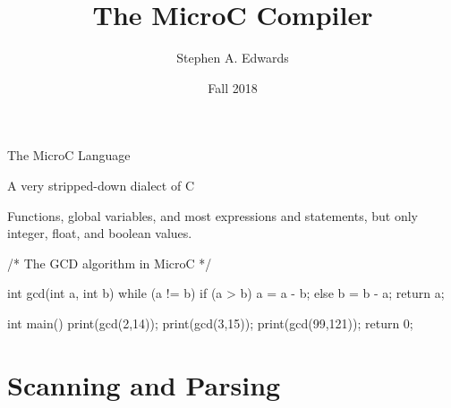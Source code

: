 \documentclass{plt}
\title{The MicroC Compiler}
\author{Stephen A. Edwards}
\institute{Columbia University}
\date{Fall 2018}
\begin{document}
\frame{\titlepage}

\frame{\tableofcontents}

\begin{frame}[fragile=singleslide]{The MicroC Language}

A very stripped-down dialect of C

Functions, global variables, and most expressions and statements, but
only integer, float, and boolean values.

\begin{C}
/* The GCD algorithm in MicroC */

int gcd(int a, int b) {
  while (a != b) {
    if (a > b) a = a - b;
    else b = b - a;
  }
  return a;
}

int main()
{
  print(gcd(2,14));
  print(gcd(3,15));
  print(gcd(99,121));
  return 0;
}
\end{C}

\end{frame}

\part{Scanning and Parsing}
\end{document}
